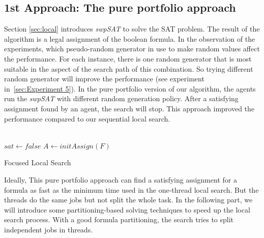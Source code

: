 \documentclass[12pt,a4paper,twoside]{scrartcl}
\numberwithin{equation}{section}
\begin{document}
\subsection{1st Approach: The pure portfolio approach}
Section \ref{sec:local} introduces \emph{swpSAT} to solve the SAT problem.
The result of the algorithm is a legal assignment of the boolean formula. In the observation of the experiments, which pseudo-random generator in use to make random values affect the performance. For each instance, there is one random generator that is most suitable in the aspect of the search path of this combination. So trying different random generator will improve the performance  (see experiment in~\ref{sec:Experiment 5}). In the pure portfolio version of our algorithm, the agents run the \emph{swpSAT} with different random generation policy. After a satisfying assignment found by an agent, the search will stop. This approach improved the performance compared to our sequential local search.\\ 
\\
\begin{algorithm}[H]
  $sat \leftarrow false$\;
    $A \leftarrow initAssign(F)$
 \caption{Focused Local Search}
\end{algorithm}  
Ideally, This pure portfolio approach can find a satisfying assignment for a formula as fast as the minimum time used in the one-thread local search. But the threads do the same jobs but not split the whole task. 
In the following part, we will introduce some partitioning-based solving techniques to speed up the local search process. With a good formula partitioning, the search tries to split independent jobs in threads. 
\end{document}
